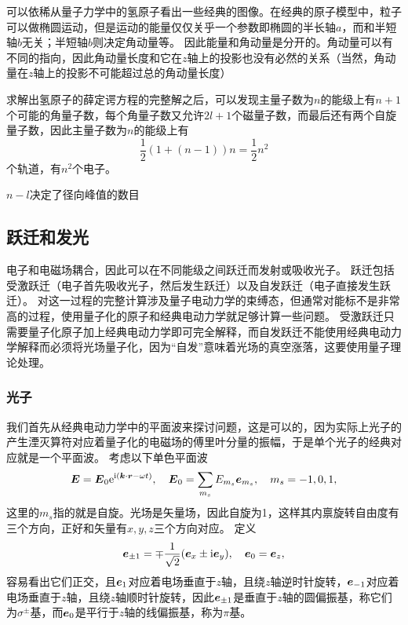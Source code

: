 \documentclass[UTF8, a4paper]{ctexart}
\newcommand*{\ee}{\mathrm{e}}
\newcommand*{\ii}{\mathrm{i}}
\begin{document}
可以依稀从量子力学中的氢原子看出一些经典的图像。在经典的原子模型中，粒子可以做椭圆运动，但是运动的能量仅仅关乎一个参数即椭圆的半长轴$a$，而和半短轴$b$无关；半短轴$b$则决定角动量等。
因此能量和角动量是分开的。角动量可以有不同的指向，因此角动量长度和它在$z$轴上的投影也没有必然的关系（当然，角动量在$z$轴上的投影不可能超过总的角动量长度）

求解出氢原子的薛定谔方程的完整解之后，可以发现主量子数为$n$的能级上有$n+1$个可能的角量子数，每个角量子数又允许$2l+1$个磁量子数，而最后还有两个自旋量子数，因此主量子数为$n$的能级上有
\[
    \frac{1}{2} (1 + (n-1)) n = \frac{1}{2}n^2
\]
个轨道，有$n^2$个电子。

$n-l$决定了径向峰值的数目

\subsection{跃迁和发光}

电子和电磁场耦合，因此可以在不同能级之间跃迁而发射或吸收光子。
跃迁包括受激跃迁（电子首先吸收光子，然后发生跃迁）以及自发跃迁（电子直接发生跃迁）。
对这一过程的完整计算涉及量子电动力学的束缚态，但通常对能标不是非常高的过程，使用量子化的原子和经典电动力学就足够计算一些问题。
受激跃迁只需要量子化原子加上经典电动力学即可完全解释，而自发跃迁不能使用经典电动力学解释而必须将光场量子化，因为“自发”意味着光场的真空涨落，这要使用量子理论处理。

\subsubsection{光子}

我们首先从经典电动力学中的平面波来探讨问题，这是可以的，因为实际上光子的产生湮灭算符对应着量子化的电磁场的傅里叶分量的振幅，于是单个光子的经典对应就是一个平面波。
考虑以下单色平面波
\begin{equation}
    \vb*{E} = \vb*{E}_0 \ee^{\ii(\vb*{k} \cdot \vb*{r} - \omega t)}, \quad \vb*{E}_0 = \sum_{m_s} E_{m_s} \vb*{e}_{m_s}, \quad m_s = -1, 0, 1,
\end{equation}
这里的$m_s$指的就是自旋。光场是矢量场，因此自旋为1，这样其内禀旋转自由度有三个方向，正好和矢量有$x, y, z$三个方向对应。
定义
\begin{equation}
    \vb*{e}_{\pm 1} = \mp \frac{1}{\sqrt{2}} (\vb*{e}_x \pm \ii \vb*{e}_y), \quad \vb*{e}_0 = \vb*{e}_z,
\end{equation}
容易看出它们正交，且$\vb*{e}_1$对应着电场垂直于$z$轴，且绕$z$轴逆时针旋转，$\vb*{e}_{-1}$对应着电场垂直于$z$轴，且绕$z$轴顺时针旋转，因此$\vb*{e}_{\pm 1}$是垂直于$z$轴的圆偏振基，称它们为$\sigma^\pm$基，而$\vb*{e}_0$是平行于$z$轴的线偏振基，称为$\pi$基。
\end{document}
